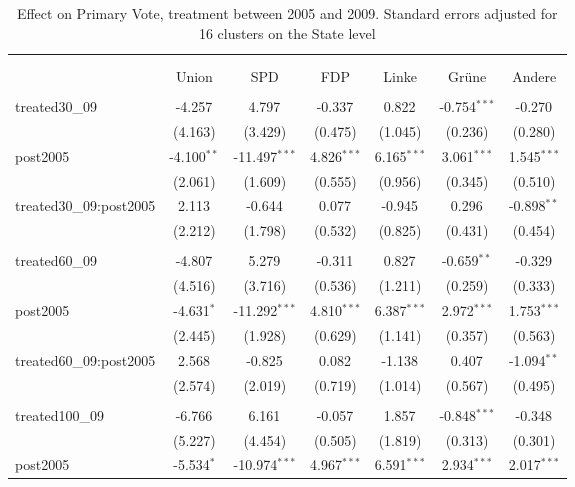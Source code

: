 \documentclass[12pt]{article}
\begin{document}
 
\begin{table}[!htbp] \centering
  \caption{Effect on Primary Vote, treatment between 2005 and 2009. Standard errors adjusted for 16 clusters on the State level}
\begin{tabular}{@{\extracolsep{5pt}}lcccccc}
\\[-1.8ex]\hline
\hline \\[-1.8ex]
\\[-1.8ex] & \multicolumn{1}{c}{Union} & \multicolumn{1}{c}{SPD} & \multicolumn{1}{c}{FDP} & \multicolumn{1}{c}{Linke} & \multicolumn{1}{c}{Grüne} & \multicolumn{1}{c}{Andere}  \\
\hline \\[-1.8ex]
 treated30_09 & -4.257$^{}$ & 4.797$^{}$ & -0.337$^{}$ & 0.822$^{}$ & -0.754$^{***}$ & -0.270$^{}$ \\
  & (4.163) & (3.429) & (0.475) & (1.045) & (0.236) & (0.280) \\
 post2005 & -4.100$^{**}$ & -11.497$^{***}$ & 4.826$^{***}$ & 6.165$^{***}$ & 3.061$^{***}$ & 1.545$^{***}$ \\
  & (2.061) & (1.609) & (0.555) & (0.956) & (0.345) & (0.510) \\
 treated30_09:post2005 & 2.113$^{}$ & -0.644$^{}$ & 0.077$^{}$ & -0.945$^{}$ & 0.296$^{}$ & -0.898$^{**}$ \\
  & (2.212) & (1.798) & (0.532) & (0.825) & (0.431) & (0.454) \\
\hline \\[-1.8ex]
 treated60_09 & -4.807$^{}$ & 5.279$^{}$ & -0.311$^{}$ & 0.827$^{}$ & -0.659$^{**}$ & -0.329$^{}$ \\
  & (4.516) & (3.716) & (0.536) & (1.211) & (0.259) & (0.333) \\
 post2005 & -4.631$^{*}$ & -11.292$^{***}$ & 4.810$^{***}$ & 6.387$^{***}$ & 2.972$^{***}$ & 1.753$^{***}$ \\
  & (2.445) & (1.928) & (0.629) & (1.141) & (0.357) & (0.563) \\
 treated60_09:post2005 & 2.568$^{}$ & -0.825$^{}$ & 0.082$^{}$ & -1.138$^{}$ & 0.407$^{}$ & -1.094$^{**}$ \\
  & (2.574) & (2.019) & (0.719) & (1.014) & (0.567) & (0.495) \\
\hline \\[-1.8ex]
 treated100_09 & -6.766$^{}$ & 6.161$^{}$ & -0.057$^{}$ & 1.857$^{}$ & -0.848$^{***}$ & -0.348$^{}$ \\
  & (5.227) & (4.454) & (0.505) & (1.819) & (0.313) & (0.301) \\
 post2005 & -5.534$^{*}$ & -10.974$^{***}$ & 4.967$^{***}$ & 6.591$^{***}$ & 2.934$^{***}$ & 2.017$^{***}$ \\

\end{tabular}
\end{table}
\end{document}
